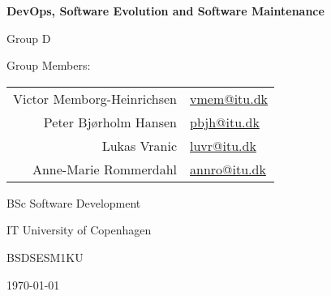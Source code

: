 \begin{titlepage}
    \centering
    \vspace*{1cm}
    
    {\Huge\bfseries DevOps, Software Evolution and Software Maintenance \par}
    \vspace{1.5cm}

    {\LARGE Group D \par}
    \vspace{1cm}
    
    {\Large Group Members: \par}
    \vspace{0.5cm}
    \begin{tabular}{rl}
        Victor Memborg-Heinrichsen & \href{mailto:vmem@itu.dk}{vmem@itu.dk} \\
        Peter Bjørholm Hansen & \href{mailto:pebj@itu.dk}{pbjh@itu.dk} \\
        Lukas Vranic & \href{mailto:luvr@itu.dk}{luvr@itu.dk} \\
        Anne-Marie Rommerdahl & \href{mailto:annro@itu.dk}{annro@itu.dk} \\
    \end{tabular}
    \vfill
    
    {\large BSc Software Development \par}
    \vspace{0.2cm}
    {\large IT University of Copenhagen \par}
    \vspace{0.2cm}
    {\large BSDSESM1KU \par}
    \vspace{0.2cm}
    {\large \today\par}
    
\end{titlepage}
